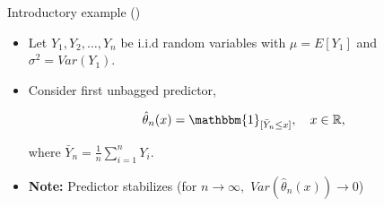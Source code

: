 \documentclass{beamer}
\begin{document}
\begin{frame}{Introductory example (\cite{Buhlmann2002})}
\begin{itemize}
\item Let $Y_{1}, Y_{2}, \dots, Y_{n}$ be i.i.d random variables with $\mu = E[Y_{1}]$ and $\sigma^{2} = Var(Y_{1})$.
\item Consider first unbagged predictor,

\begin{equation}\label{unbagged}
\hat{\theta}_{n}(x) = \mathbbm{1}_{[\bar{Y}_{n} \leq x]},\quad x\in  \mathbb{R},
\end{equation}

where $\bar{Y}_{n} = \frac{1}{n}\sum_{i=1}^{n}Y_{i}.$\\

\item \textbf{Note:} Predictor stabilizes (for $n \rightarrow \infty,$ $Var(\hat{\theta}_{n}(x)) \rightarrow 0$) 

\end{itemize}

\end{frame}
\end{document}
